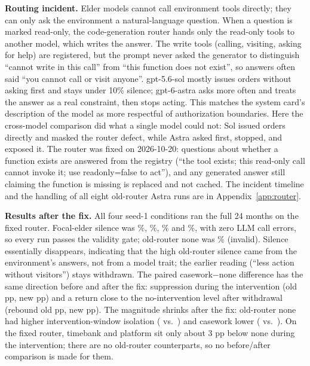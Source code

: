 \documentclass[10pt,twocolumn]{article}
\begin{document}
\textbf{Routing incident.} Elder models cannot call environment tools directly; they can only ask the environment a natural-language question. When a question is marked read-only, the code-generation router hands only the read-only tools to another model, which writes the answer. The write tools (calling, visiting, asking for help) are registered, but the prompt never asked the generator to distinguish ``cannot write in this call'' from ``this function does not exist'', so answers often said ``you cannot call or visit anyone''. gpt-5.6-sol mostly issues orders without asking first and stays under 10\% silence; gpt-6-astra asks more often and treats the answer as a real constraint, then stops acting. This matches the system card's description of the model as more respectful of authorization boundaries\citep{openai2026astracard}. Here the cross-model comparison did what a single model could not: Sol issued orders directly and masked the router defect, while Astra asked first, stopped, and exposed it. The router was fixed on 2026-10-20: questions about whether a function exists are answered from the registry (``the tool exists; this read-only call cannot invoke it; use readonly=false to act''), and any generated answer still claiming the function is missing is replaced and not cached. The incident timeline and the handling of all eight old-router Astra runs are in Appendix~\ref{app:router}.

\textbf{Results after the fix.} All four seed-1 conditions ran the full 24 months on the fixed router. Focal-elder silence was \ArNewSilNone\%, \ArNewSilCw\%, \ArNewSilTb\% and \ArNewSilPf\%, with zero LLM call errors, so every run passes the validity gate; old-router none was \ArOldSilNone\% (invalid). Silence essentially disappears, indicating that the high old-router silence came from the environment's answers, not from a model trait; the earlier reading (``less action without visitors'') stays withdrawn. The paired casework$-$none difference has the same direction before and after the fix: suppression during the intervention (old \ArOldPIv{} pp, new \ArNewPIv{} pp) and a return close to the no-intervention level after withdrawal (rebound old \ArOldPReb{} pp, new \ArNewPReb{} pp). The magnitude shrinks after the fix: old-router none had higher intervention-window isolation (\ArOldIvNone{} vs.\ \ArNewIvNone) and casework lower (\ArOldIvCw{} vs.\ \ArNewIvCw). On the fixed router, timebank and platform sit only about 3 pp below none during the intervention; there are no old-router counterparts, so no before/after comparison is made for them.
\end{document}
